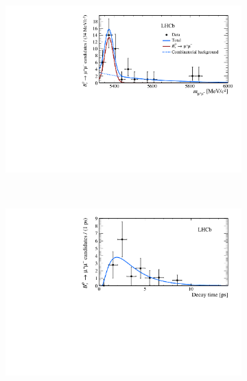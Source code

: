 {\begin{figure}[htbp]
    \centering
   \begin{subfigure}[b]{0.48\textwidth}
        \includegraphics[width= \textwidth]{./Figs/LifetimeMeasurement/mass_fit_lifetime.pdf}
    \end{subfigure}
   ~ %
    \begin{subfigure}[b]{0.48\textwidth}
       \includegraphics[width=\textwidth]{./Figs/LifetimeMeasurement/lifetime_fit.pdf}

\end{subfigure}
\end{figure}}
